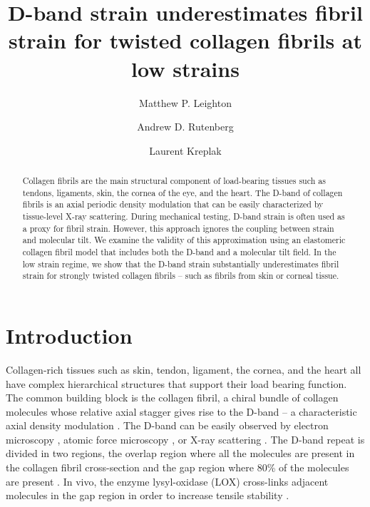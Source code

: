 \documentclass[preprint,12pt]{elsarticle}
\begin{document}
\begin{frontmatter}

\title{D-band strain underestimates fibril strain for twisted collagen fibrils at low strains}
\author[inst1,inst2]{Matthew P. Leighton}


\author[inst1]{Andrew D. Rutenberg}
\author[inst1]{Laurent Kreplak}


\begin{abstract}
Collagen fibrils are the main structural component of load-bearing tissues such as tendons, ligaments, skin, the cornea of the eye, and the heart. The D-band of collagen fibrils is an axial periodic density modulation that can be easily characterized by tissue-level X-ray scattering. During mechanical testing, D-band strain is often used as a proxy for fibril strain. However, this approach ignores the coupling between strain and molecular tilt. We examine the validity of this approximation using an elastomeric collagen fibril model that includes both the D-band and a molecular tilt field. In the low  strain regime, we show that the D-band strain substantially underestimates fibril strain for strongly twisted collagen fibrils -- such as fibrils from skin or corneal tissue.
\end{abstract}


\end{frontmatter}


\section{Introduction}
\label{sec:intro}
Collagen-rich tissues such as skin, tendon, ligament, the cornea, and the heart all have complex hierarchical structures that support their load bearing function. The common building block is the collagen fibril, a chiral bundle of collagen molecules whose relative axial stagger gives rise to the D-band --  a characteristic axial density modulation \cite{Orgel:2006}. The D-band can be easily observed by electron microscopy \cite{Hodge:1960}, atomic force microscopy \cite{Fang:2013}, or X-ray scattering \cite{Sasaki:1996}. The D-band repeat is divided in two regions, the overlap region where all the molecules are present in the collagen fibril cross-section and the gap region where 80\% of the molecules are present \cite{Orgel:2006}. In vivo, the enzyme lysyl-oxidase (LOX) cross-links adjacent molecules in the gap region in order to increase tensile stability \cite{Orgel:2001,Makris:2014}. 
\end{document}
